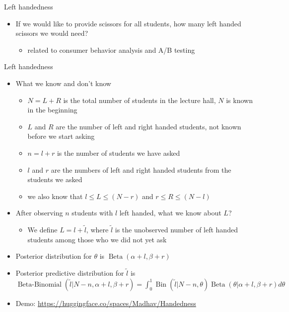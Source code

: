 \documentclass[english,t]{beamer}
\DeclareMathOperator{\Bin}{Bin}
\DeclareMathOperator{\Beta}{Beta}
\DeclareMathOperator{\BetaBinomial}{Beta-Binomial}
\begin{document}
\begin{frame}{Left handedness}

  \begin{itemize}
  \item<+-> If we would like to provide scissors for all students, how
    many left handed scissors we would need?
    \begin{itemize}
    \item related to consumer behavior analysis and A/B testing
  \end{itemize}
\end{itemize}  

\end{frame}

\begin{frame}{Left handedness}

  \vspace{-0.5\baselineskip}
  \begin{itemize}
  \item<+-> What we know and don't know
    \begin{itemize}
    \item $N=L+R$ is the total number of students in the lecture hall,
      $N$ is known in the beginning
    \item<+-> $L$ and $R$ are the number of left and right handed students, not known before we start asking
    \item<+-> $n=l+r$ is the number of students we have asked
    \item<+-> $l$ and $r$ are the numbers of left and right handed students from the students we asked
    \item<+-> we also know that $l \leq L \leq (N-r)$ and $r \leq R \leq (N-l)$
    \end{itemize}
  \item<+-> After observing $n$ students with $l$ left handed, what we
    know about $L$?
    \begin{itemize}
    \item We define $L=l+\tilde{l}$, where $\tilde{l}$ is the
      unobserved number of left handed students among those who we did
      not yet ask
    \end{itemize}
  \item<+-> {\color{blue} Posterior} distribution for
    $\theta$ is $\Beta(\alpha+l, \beta+r)$
  \item<+-> {\color{red} Posterior predictive} distribution for
    $\tilde{l}$ is\\
    $\BetaBinomial(\tilde{l} | N-n, \alpha+l, \beta+r)=\int_0^1\Bin(\tilde{l} | N-n, \theta)\Beta(\theta | \alpha+l, \beta+r)d\theta$
  \item<+-> {\small Demo: \url{https://huggingface.co/spaces/Madhav/Handedness}}
  \end{itemize}
  
\end{frame}
\end{document}
